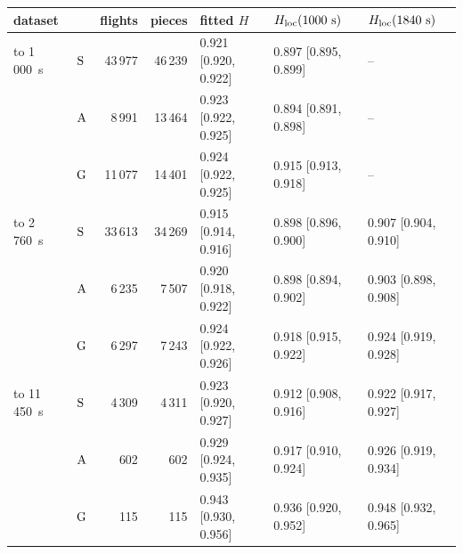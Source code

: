 \begin{tabular}{@{}l l r r l l l@{}}
\toprule
dataset & & flights & pieces & fitted $H$ & $H_\mathrm{loc}(1000~\mathrm{s})$ & $H_\mathrm{loc}(1840~\mathrm{s})$ \\
\midrule
to 1\,000~s & $\mathrm{S}$ & 43\,977 & 46\,239 & 0.921 [0.920, 0.922] & 0.897 [0.895, 0.899] & -- \\
 & $\mathrm{A}$ & 8\,991 & 13\,464 & 0.923 [0.922, 0.925] & 0.894 [0.891, 0.898] & -- \\
 & $\mathrm{G}$ & 11\,077 & 14\,401 & 0.924 [0.922, 0.925] & 0.915 [0.913, 0.918] & -- \\
\midrule
to 2\,760~s & $\mathrm{S}$ & 33\,613 & 34\,269 & 0.915 [0.914, 0.916] & 0.898 [0.896, 0.900] & 0.907 [0.904, 0.910] \\
 & $\mathrm{A}$ & 6\,235 & 7\,507 & 0.920 [0.918, 0.922] & 0.898 [0.894, 0.902] & 0.903 [0.898, 0.908] \\
 & $\mathrm{G}$ & 6\,297 & 7\,243 & 0.924 [0.922, 0.926] & 0.918 [0.915, 0.922] & 0.924 [0.919, 0.928] \\
\midrule
to 11\,450~s & $\mathrm{S}$ & 4\,309 & 4\,311 & 0.923 [0.920, 0.927] & 0.912 [0.908, 0.916] & 0.922 [0.917, 0.927] \\
 & $\mathrm{A}$ & 602 & 602 & 0.929 [0.924, 0.935] & 0.917 [0.910, 0.924] & 0.926 [0.919, 0.934] \\
 & $\mathrm{G}$ & 115 & 115 & 0.943 [0.930, 0.956] & 0.936 [0.920, 0.952] & 0.948 [0.932, 0.965] \\
\bottomrule
\end{tabular}
